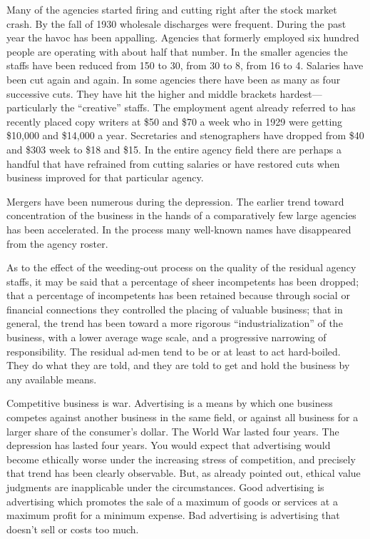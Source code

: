 \documentclass[openany,nobib]{tufte-book}
\begin{document}
Many of the agencies started firing and cutting right after the stock
market crash. By the fall of 1930 wholesale discharges were frequent.
During the past year the havoc has been appalling. Agencies that
formerly employed six hundred people are operating with about half that
number. In the smaller agencies the staffs have been reduced from 150 to
30, from 30 to 8, from 16 to 4. Salaries have been cut again and again.
In some agencies there have been as many as four successive cuts. They
have hit the higher and middle brackets hardest---particularly the
``creative'' staffs. The employment agent already referred to has
recently placed copy writers at \$50 and \$70 a week who in 1929 were
getting \$10,000 and \$14,000 a year. Secretaries and stenographers have
dropped from \$40 and \$303 week to \$18 and \$15. In the entire agency
field there are perhaps a handful that have refrained from cutting
salaries or have restored cuts when business improved for that
particular agency.

Mergers have been numerous during the depression. The earlier trend
toward concentration of the business in the hands of a comparatively few
large agencies has been accelerated. In the process many well-known
names have disappeared from the agency roster.

As to the effect of the weeding-out process on the quality of the
residual agency staffs, it may be said that a percentage of sheer
incompetents has been dropped; that a percentage of incompetents has
been retained because through social or financial connections they
controlled the placing of valuable business; that in general, the trend
has been toward a more rigorous ``industrialization'' of the business,
with a lower average wage scale, and a progressive narrowing of
responsibility. The residual ad-men tend to be or at least to act
hard-boiled. They do what they are told, and they are told to get and
hold the business by any available means.

Competitive business is war. Advertising is a means by which one
business competes against another business in the same field, or against
all business for a larger share of the consumer's dollar. The World War
lasted four years. The depression has lasted four years. You would
expect that advertising would become ethically worse under the
increasing stress of competition, and precisely that trend has been
clearly observable. But, as already pointed out, ethical value judgments
are inapplicable under the circumstances. Good advertising is
advertising which promotes the sale of a maximum of goods or services at
a maximum profit for a minimum expense. Bad advertising is advertising
that doesn't sell or costs too much.
\end{document}
